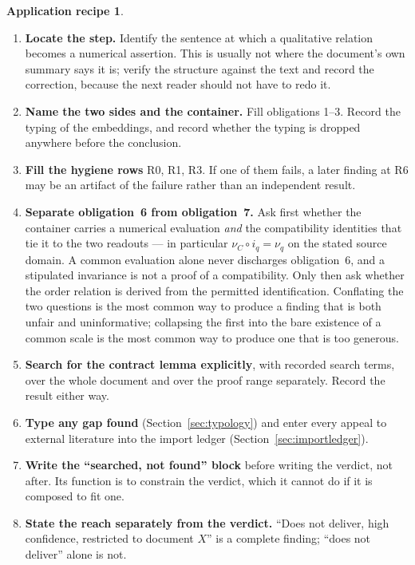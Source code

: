 \documentclass[11pt,a4paper]{article}
\theoremstyle{definition}
\newtheorem*{recipe}{Application recipe}
\begin{document}
\begin{recipe}
\begin{enumerate}
\item \textbf{Locate the step.} Identify the sentence at which a qualitative
  relation becomes a numerical assertion. This is usually not where the
  document's own summary says it is; verify the structure against the text and
  record the correction, because the next reader should not have to redo it.
\item \textbf{Name the two sides and the container.} Fill obligations 1--3.
  Record the typing of the embeddings, and record whether the typing is dropped
  anywhere before the conclusion.
\item \textbf{Fill the hygiene rows} R0, R1, R3. If one of them fails, a later
  finding at R6 may be an artifact of the failure rather than an independent
  result.
\item \textbf{Separate obligation~6 from obligation~7.} Ask first whether the
  container carries a numerical evaluation \emph{and} the compatibility
  identities that tie it to the two readouts --- in particular
  $\nu_C \circ i_q = \nu_q$ on the stated source domain. A common evaluation
  alone never discharges obligation~6, and a stipulated invariance is not a
  proof of a compatibility. Only then ask whether the order relation is derived
  from the permitted identification. Conflating the two questions is the most
  common way to produce a finding that is both unfair and uninformative;
  collapsing the first into the bare existence of a common scale is the most
  common way to produce one that is too generous.
\item \textbf{Search for the contract lemma explicitly}, with recorded search
  terms, over the whole document and over the proof range separately. Record the
  result either way.
\item \textbf{Type any gap found} (Section~\ref{sec:typology}) and enter every
  appeal to external literature into the import ledger
  (Section~\ref{sec:importledger}).
\item \textbf{Write the ``searched, not found'' block} before writing the
  verdict, not after. Its function is to constrain the verdict, which it cannot
  do if it is composed to fit one.
\item \textbf{State the reach separately from the verdict.} ``Does not deliver,
  high confidence, restricted to document $X$'' is a complete finding;
  ``does not deliver'' alone is not.
\end{enumerate}
\end{recipe}
\end{document}
